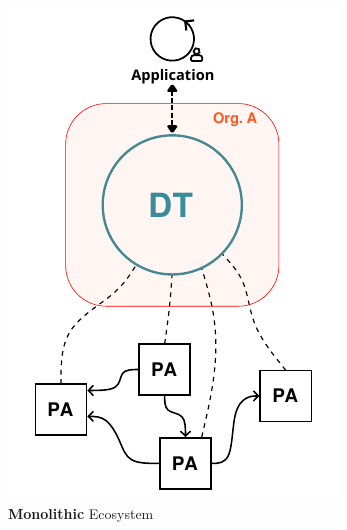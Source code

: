 \begin{figure}[t]
    \centering
    \begin{subfigure}[t]{0.32\textwidth}
        \centering
        \includegraphics[width=\textwidth]{figures/hwodt/ecosystems_types-monolithic.pdf}
        \caption{\textbf{Monolithic} Ecosystem}
        \label{fig:ecosystem-monolithic}
    \end{subfigure}
    \hfill
    \begin{subfigure}[t]{0.32\textwidth}
        \centering

\end{subfigure}
\end{figure}
